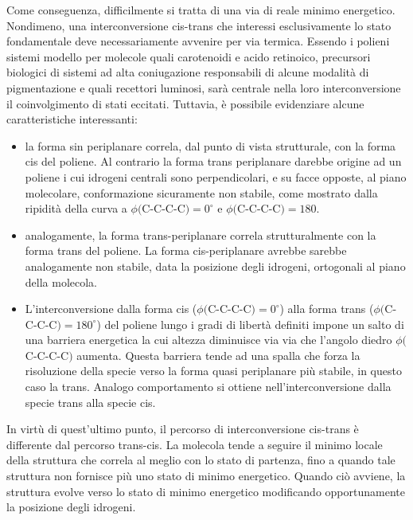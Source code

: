 Come conseguenza, difficilmente si tratta di una via di reale minimo energetico.
Nondimeno, una interconversione cis-trans che interessi esclusivamente lo stato
fondamentale deve necessariamente avvenire per via termica. Essendo i
polieni sistemi modello per molecole quali carotenoidi e acido retinoico,
precursori biologici di sistemi ad alta coniugazione responsabili di alcune
modalit\`a di pigmentazione e quali recettori luminosi, sar\`a centrale
nella loro interconversione il coinvolgimento di stati eccitati.
Tuttavia, \`e possibile evidenziare alcune caratteristiche interessanti:
\begin{itemize}
\item la forma sin periplanare correla, dal punto di vista strutturale, con
la forma cis del poliene. Al contrario la forma trans periplanare darebbe
origine ad un poliene i cui idrogeni centrali sono perpendicolari, e su
facce opposte, al piano molecolare, conformazione sicuramente non stabile,
come mostrato dalla ripidit\`a della curva a $\phi($C-C-C-C$) = 0^{\circ}$ e
$\phi($C-C-C-C$) = 180$.
\item analogamente, la forma trans-periplanare correla strutturalmente con
la forma trans del poliene. La forma cis-periplanare avrebbe sarebbe
analogamente non stabile, data la posizione degli idrogeni, ortogonali al
piano della molecola.
\item L'interconversione dalla forma cis ($\phi($C-C-C-C$) = 0^{\circ}$) alla forma
trans ($\phi($C-C-C-C$) = 180^{\circ}$) del poliene lungo i gradi di libert\`a definiti
impone un salto di una barriera energetica la cui altezza diminuisce via via
che l'angolo diedro $\phi($C-C-C-C$)$ aumenta. Questa barriera tende ad una
spalla che forza la risoluzione della specie verso la forma quasi
periplanare pi\`u stabile, in questo caso la trans. Analogo comportamento si
ottiene nell'interconversione dalla specie trans alla specie cis.
\end{itemize}

In virt\`u di quest'ultimo punto, il percorso di interconversione cis-trans
\`e differente dal percorso trans-cis. La molecola tende a seguire il minimo
locale della struttura che correla al meglio con lo stato di partenza, fino
a quando tale struttura non fornisce pi\`u uno stato di minimo energetico.
Quando ci\`o avviene, la struttura evolve verso lo stato di minimo energetico
modificando opportunamente la posizione degli idrogeni.

